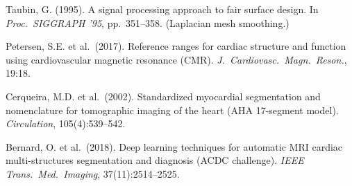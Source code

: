 \documentclass[a4paper,12pt]{article}
\begin{document}
\begin{enumerate}[label={[\arabic*]}, nosep]
  \item Taubin, G. (1995). A signal processing approach to fair
        surface design. In \emph{Proc.\ SIGGRAPH '95}, pp.\ 351--358.
        (Laplacian mesh smoothing.)
  \item Petersen, S.E. et al.\ (2017). Reference ranges for cardiac
        structure and function using cardiovascular magnetic
        resonance (CMR). \emph{J.\ Cardiovasc.\ Magn.\ Reson.},
        19:18.
  \item Cerqueira, M.D. et al.\ (2002). Standardized myocardial
        segmentation and nomenclature for tomographic imaging of
        the heart (AHA 17-segment model). \emph{Circulation},
        105(4):539--542.
  \item Bernard, O. et al.\ (2018). Deep learning techniques for
        automatic MRI cardiac multi-structures segmentation and
        diagnosis (ACDC challenge). \emph{IEEE Trans.\ Med.\
        Imaging}, 37(11):2514--2525.
\end{enumerate}
\end{document}
